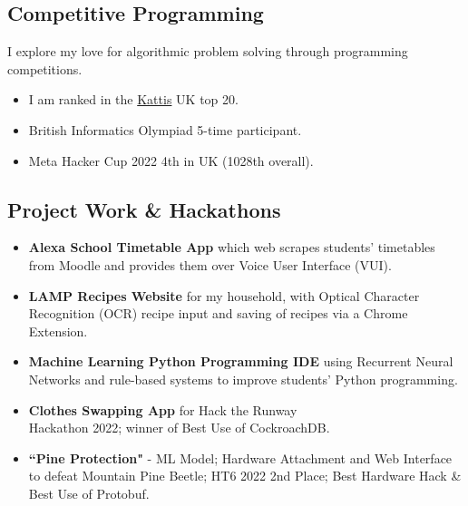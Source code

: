 \documentclass{Resume}
\begin{document}
		\subsection{Competitive Programming}
			I explore my love for algorithmic problem solving through programming competitions. 
			\begin{itemize}
			    \item I am ranked in the \href{https://open.kattis.com/countries/GBR}{Kattis} UK top 20.
			    \item British Informatics Olympiad 5-time participant.
			    \item Meta Hacker Cup 2022 4th in UK (1028th overall).

			    
			\end{itemize}
		\subsection{Project Work \& Hackathons}
			\begin{itemize}[itemsep=1mm, parsep=0pt]
				\item \textbf{Alexa School Timetable App} which web scrapes students' timetables from Moodle and provides them over Voice User Interface (VUI).
				\item \textbf{LAMP Recipes Website} for my household, with Optical Character Recognition (OCR) recipe input and saving of recipes via a Chrome Extension.
				\item \textbf{Machine Learning Python Programming IDE} using Recurrent Neural Networks and rule-based systems to improve students' Python programming. %
				\item \textbf{Clothes Swapping App} for Hack the Runway \\ Hackathon 2022; winner of Best Use of CockroachDB.
				\item \textbf{``Pine Protection"} - ML Model; Hardware Attachment and Web Interface to defeat Mountain Pine Beetle; HT6 2022 2nd Place; Best Hardware Hack \& Best Use of Protobuf.
			\end{itemize}
\end{document}
